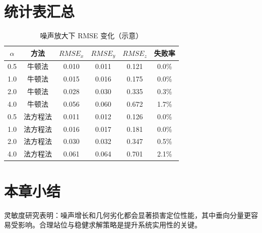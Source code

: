 \section{统计表汇总}
\begin{table}[H]
\centering
\caption{噪声放大下 RMSE 变化（示意）}
\begin{tabular}{cccccc}
\toprule
$\alpha$ & 方法 & $RMSE_x$ & $RMSE_y$ & $RMSE_z$ & 失败率 \\
\midrule
0.5 & 牛顿法 & 0.010 & 0.011 & 0.121 & 0.0\% \\
1.0 & 牛顿法 & 0.015 & 0.016 & 0.175 & 0.0\% \\
2.0 & 牛顿法 & 0.028 & 0.030 & 0.335 & 0.3\% \\
4.0 & 牛顿法 & 0.056 & 0.060 & 0.672 & 1.7\% \\
\midrule
0.5 & 法方程法 & 0.011 & 0.012 & 0.126 & 0.0\% \\
1.0 & 法方程法 & 0.016 & 0.017 & 0.181 & 0.0\% \\
2.0 & 法方程法 & 0.030 & 0.032 & 0.347 & 0.5\% \\
4.0 & 法方程法 & 0.061 & 0.064 & 0.701 & 2.1\% \\
\bottomrule
\end{tabular}
\end{table}

\section{本章小结}
灵敏度研究表明：噪声增长和几何劣化都会显著损害定位性能，其中垂向分量更容易受影响。合理站位与稳健求解策略是提升系统实用性的关键。
